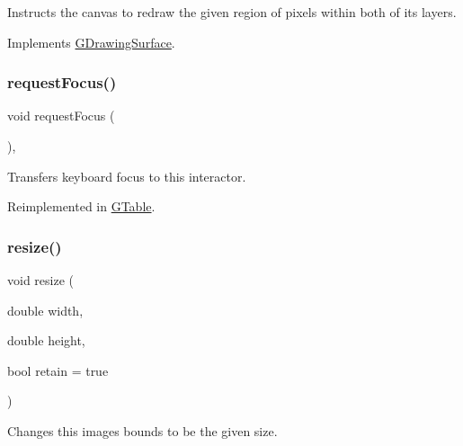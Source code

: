 Instructs the canvas to redraw the given region of pixels within both of its layers. 



Implements \mbox{\hyperlink{classsgl_1_1GDrawingSurface_a1a3898317080fecf8af21bbeaeeb37c3}{G\+Drawing\+Surface}}.

\mbox{\label{classsgl_1_1GInteractor_a519fb2ac767f8b2febbb50b898b8c8cb}} 
\subsubsection{\texorpdfstring{request\+Focus()}{requestFocus()}}
{\footnotesize\ttfamily void request\+Focus (\begin{DoxyParamCaption}{ }\end{DoxyParamCaption})\hspace{0.3cm}{\ttfamily [virtual]}, {\ttfamily [inherited]}}



Transfers keyboard focus to this interactor. 



Reimplemented in \mbox{\hyperlink{classsgl_1_1GTable_a5921efd0a5a83eacebdadb749fb3ea7a}{G\+Table}}.

\mbox{\label{classsgl_1_1GCanvas_a090053938117ab698c4c9c1f1cff74a9}} 
\subsubsection{\texorpdfstring{resize()}{resize()}}
{\footnotesize\ttfamily void resize (\begin{DoxyParamCaption}\item[{double}]{width,  }\item[{double}]{height,  }\item[{bool}]{retain = {\ttfamily true} }\end{DoxyParamCaption})}



Changes this image\textquotesingle{}s bounds to be the given size. 

